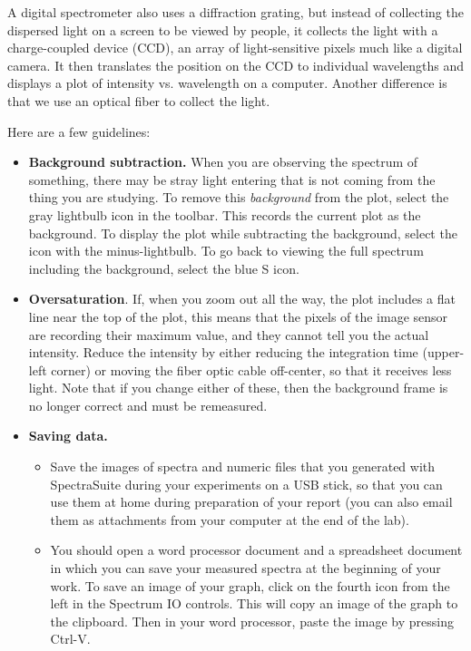 A digital spectrometer also uses a diffraction grating, but instead of collecting the dispersed light on a screen to be viewed by people, it collects the light with a charge-coupled device (CCD), an array of light-sensitive pixels much like a digital camera. It then translates the position on the CCD to individual wavelengths and displays a plot of intensity vs. wavelength on a computer. %
Another difference is that we use an optical fiber to collect the light.

Here are a few guidelines:
\begin{itemize}
	
	\item \textbf{Background subtraction.} When you are observing the spectrum of something, there may be stray light entering that is not coming from the thing you are studying. To remove this \textit{background} from the plot, select the gray lightbulb icon in the toolbar. This records the current plot as the background. To display the plot while subtracting the background, select the icon with the minus-lightbulb. To go back to viewing the full spectrum including the background, select the blue S icon.

	\item \textbf{Oversaturation}. If, when you zoom out all the way, the plot includes a flat line near the top of the plot, this means that the pixels of the image sensor are recording their maximum value, and they cannot tell you the actual intensity. Reduce the intensity by either reducing the integration time (upper-left corner) or moving the fiber optic cable off-center, so that it receives less light. Note that if you change either of these, then the background frame is no longer correct and must be remeasured.

	\item \textbf{Saving data.}
	
	\begin{itemize}
		\item Save the images of spectra and numeric files that you generated with SpectraSuite
	during your experiments on a USB stick, so that you can use them at home during
	preparation of your report (you can also email them as attachments from your
	computer at the end of the lab).
	
	\item You should open a word processor document and a spreadsheet document in which you can save your measured
	spectra at the beginning of your work. To save an image of your graph, click on
	the fourth icon from the left in the Spectrum IO controls. %
	This will copy
	an image of the graph to the clipboard. Then in your word processor, paste the image by pressing
	Ctrl-V.
	

\end{itemize}
\end{itemize}

